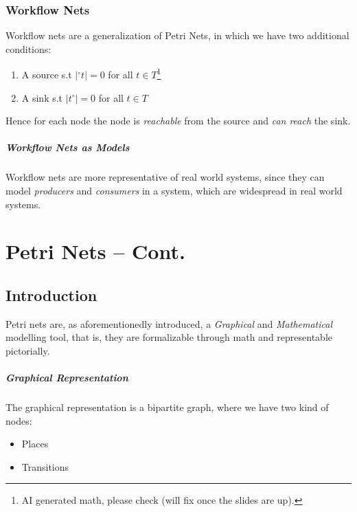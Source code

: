 \documentclass[openright, twoside, twocolumn]{report}
\begin{document}
    \subsection{Workflow Nets}
    
    Workflow nets are a generalization of Petri Nets, in which we have two additional conditions:

    \begin{enumerate}
      \item A source s.t $|{}^{\circ}t| = 0$ for all $t \in T$\footnote{
        AI generated math, please check (will fix once the slides are up).
      }
      \item A sink s.t $|t^{\circ}| = 0$ for all $t \in T$
    \end{enumerate}
    
    Hence for each node the node is \emph{reachable} from the source and \emph{can reach} the sink.

    \paragraph{Workflow Nets as Models}
    Workflow nets are more representative of real world systems, since they can model \emph{producers} and 
    \emph{consumers} in a system, which are widespread in real world systems. 
    

    \chapter{Petri Nets -- Cont.}
    \section{Introduction} 
    Petri nets are, as aforementionedly introduced, a \emph{Graphical} and \emph{Mathematical} modelling tool, 
    that is, they are formalizable through math and representable pictorially. 

    \paragraph{Graphical Representation}

    The graphical representation is a bipartite graph, where we have two kind of nodes:
    
    \begin{itemize}
      \item Places
      \item Transitions
    \end{itemize}
\end{document}

